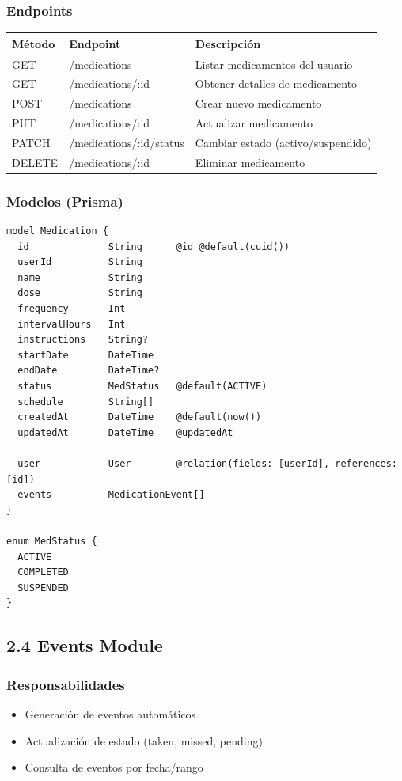 \documentclass[12pt,a4paper]{article}
\begin{document}
\subsubsection{Endpoints}

\begin{center}
\begin{tabular}{|l|l|l|}
\hline
\rowcolor{lightblue}
\textbf{Método} & \textbf{Endpoint} & \textbf{Descripción} \\
\hline
GET & /medications & Listar medicamentos del usuario \\
\hline
GET & /medications/:id & Obtener detalles de medicamento \\
\hline
POST & /medications & Crear nuevo medicamento \\
\hline
PUT & /medications/:id & Actualizar medicamento \\
\hline
PATCH & /medications/:id/status & Cambiar estado (activo/suspendido) \\
\hline
DELETE & /medications/:id & Eliminar medicamento \\
\hline
\end{tabular}
\end{center}

\subsubsection{Modelos (Prisma)}

\begin{verbatim}
model Medication {
  id              String      @id @default(cuid())
  userId          String
  name            String
  dose            String
  frequency       Int
  intervalHours   Int
  instructions    String?
  startDate       DateTime
  endDate         DateTime?
  status          MedStatus   @default(ACTIVE)
  schedule        String[]
  createdAt       DateTime    @default(now())
  updatedAt       DateTime    @updatedAt
  
  user            User        @relation(fields: [userId], references: [id])
  events          MedicationEvent[]
}

enum MedStatus {
  ACTIVE
  COMPLETED
  SUSPENDED
}
\end{verbatim}

\subsection{2.4 Events Module}

\subsubsection{Responsabilidades}
\begin{itemize}
    \item Generación de eventos automáticos
    \item Actualización de estado (taken, missed, pending)
    \item Consulta de eventos por fecha/rango
\end{itemize}
\end{document}
